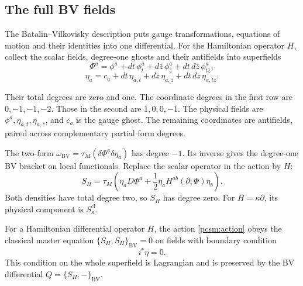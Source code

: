 \subsection{The full BV fields}

The Batalin--Vilkovisky description puts gauge transformations,
equations of motion and their identities into one differential.
For the Hamiltonian operator \(H\), collect the scalar fields,
degree-one ghosts and their antifields into superfields
\[
 \Phi^a=\phi^a+dt\,\phi^a_t+d\bar z\,\phi^a_{\bar z}
                  +dt\,d\bar z\,\phi^a_{t\bar z},
\]
\[
 \eta_a=c_a+dt\,\eta_{a,t}+d\bar z\,\eta_{a,\bar z}
                  +dt\,d\bar z\,\eta_{a,t\bar z}.
\]

Their total degrees are zero and one.
The coordinate degrees in the first row are \(0,-1,-1,-2\).
Those in the second are \(1,0,0,-1\).
The physical fields are \(\phi^a,\eta_{a,t},\eta_{a,\bar z}\),
and \(c_a\) is the gauge ghost. The remaining coordinates are
antifields, paired across complementary partial form degrees.

The two-form
\(\omega_{\mathrm{BV}}=\tau_M(\delta\Phi^a\delta\eta_a)\)
has degree \(-1\). Its inverse gives the degree-one BV bracket on
local functionals. Replace the scalar operator in the action by \(H\):
\begin{equation}\label{pcsm:action}
 S_H=\tau_M\left(\eta_aD\Phi^a
          +\frac12\eta_aH^{ab}(\partial;\Phi)\eta_b\right).
\end{equation}
Both densities have total degree two, so \(S_H\) has degree zero.
For \(H=\kappa\partial\), its physical component is
\(S^{\mathrm{cl}}_\kappa\).

\begin{proposition}\label{pcsm:classical}
For a Hamiltonian differential operator \(H\), the action
\eqref{pcsm:action} obeys the classical master equation
\(\{S_H,S_H\}_{\mathrm{BV}}=0\) on fields with boundary condition
\begin{equation}\label{pcsm:boundary}
 i^*\eta=0.
\end{equation}
This condition on the whole superfield is Lagrangian and is preserved
by the BV differential \(Q=\{S_H,-\}_{\mathrm{BV}}\).
\end{proposition}

